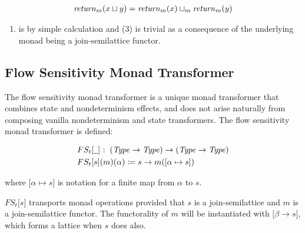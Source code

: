 \small\begin{alignat*}{1}
 \operatorname{\mathit{return}} _m  (x  \sqcup  y) =  \operatorname{\mathit{return}} _m  (x)  \sqcup  _m   \operatorname{\mathit{return}} _m  (y)
\end{alignat*}\normalsize

\begin{enumerate}
\def\labelenumi{(\arabic{enumi})}
\setcounter{enumi}{1}
\itemsep1pt\parskip0pt
\item
  is by simple calculation and (3) is trivial as a consequence of the
  underlying monad being a join-semilattice functor.
\end{enumerate}

\par

\subsection{Flow Sensitivity Monad
Transformer}\label{flow-sensitivity-monad-transformer}

\par

The flow sensitivity monad transformer is a unique monad transformer
that combines state and nondeterminism effects, and does not arise
naturally from composing vanilla nondeterminism and state transformers.
The flow sensitivity monad transformer is defined:

\small\begin{align*}
&\hspace{0em} FS _t  \lbrack  \underline{\hspace{0.5em}}  \rbrack   \mathbin{\colon}   (\operatorname{\mathit{Type}}   \rightarrow   \operatorname{\mathit{Type}})   \rightarrow   (\operatorname{\mathit{Type}}   \rightarrow   \operatorname{\mathit{Type}})  \\
&\hspace{0em} FS _t  \lbrack s \rbrack (m)( \alpha )  \coloneqq  s  \rightarrow  m( \lbrack  \alpha   \mapsto  s \rbrack )
\end{align*}\normalsize

where $ \lbrack  \alpha   \mapsto  s \rbrack $ is notation for a finite
map from $ \alpha $ to $s$.

\par

$FS _t  \lbrack s \rbrack $ transports monad operations provided that
$s$ is a join-semilattice and $m$ is a join-semilattice functor. The
functorality of $m$ will be instantiated with
$ \lbrack  \beta   \rightarrow  s \rbrack $, which forms a lattice when
$s$ does also.

